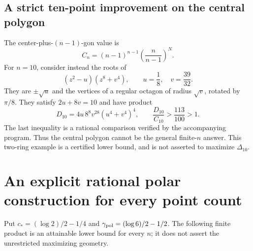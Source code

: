 \documentclass[11pt]{article}
\theoremstyle{remark}
\numberwithin{equation}{section}
\begin{document}
\subsection{A strict ten-point improvement on the central polygon}
The center-plus-$(n-1)$-gon value is
\[
 C_n=(n-1)^{n-1}\left(\frac n{n-1}\right)^N.
\]
For $n=10$, consider instead the roots of
\begin{equation}\label{eq:ten-polynomial}
 (z^2-u)(z^8+v^4),\qquad u=\frac18,\quad v=\frac{39}{32}.
\end{equation}
They are $\pm\sqrt u$ and the vertices of a regular octagon of
radius $\sqrt v$, rotated by $\pi/8$.
They satisfy $2u+8v=10$ and have product
\begin{equation}\label{eq:ten-product}
 D_{10}=4u\,8^8v^{28}(u^4+v^4)^4,\qquad
 \frac{D_{10}}{C_{10}}>\frac{113}{100}>1.
\end{equation}
The last inequality is a rational comparison verified by the
accompanying program. Thus the central polygon cannot be the general
finite-$n$ answer. This two-ring example is a certified lower bound,
and is not asserted to maximize $\Delta_{10}$.

\section{An explicit rational polar construction for every point count}
\label{sec:polar-all-n}

Put $c_*=(\log2)/2-1/4$ and
$\gamma_{\rm pol}=(\log6)/2-1/2$.
The following finite product is an attainable lower bound for every
$n$; it does not assert the unrestricted maximizing geometry.
\end{document}
